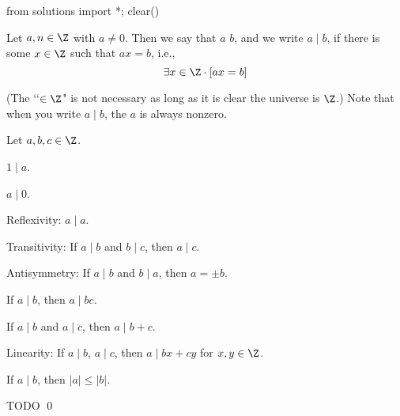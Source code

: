 \begin{python0}
from solutions import *; clear()
\end{python0}

\begin{defn}
  Let $a, n \in \Z$ with $a \neq 0$.
  Then we say that $a$  $b$, and we write $a \mid b$, if
  there is some $x \in \Z$ such that $ax = b$, i.e.,
  \[
  \exists x \in \Z \cdot [ax = b]
  \]
\end{defn}
(The \lq\lq $\in \Z$" is not necessary as long as it is clear the universe
is $\Z$.)
Note that when you write $a \mid b$, the $a$ is always nonzero.

\begin{prop}
  Let $a, b, c \in \Z$.
  \begin{myenum}
  \item $1 \mid a$.
  \item $a \mid 0$.
  \item \textnormal{Reflexivity}:
    $a \mid a$.
  \item \textnormal{Transitivity}:
    If $a \mid b$ and $b \mid c$, then $a \mid c$.
  \item \textnormal{Antisymmetry:}
    If $a \mid b$ and $b \mid a$, then $a = \pm b$.  
  \item If $a \mid b$, then $a \mid bc$.
  \item If $a \mid b$ and $a \mid c$, then $a \mid b + c$.
  \item \textnormal{Linearity}:
    If $a \mid b$, $a \mid c$, then $a \mid bx + cy$ for $x,y \in \Z$.
  \item
    If $a \mid b$, then $|a| \leq |b|$.
  \end{myenum}   
\end{prop}
\proof
TODO
\qed

